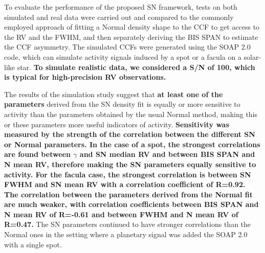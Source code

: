 \documentclass{aa}
\begin{document}
To evaluate the performance of the proposed SN framework, tests on both simulated and real data were carried out and compared to the commonly employed approach of fitting a Normal density shape to the CCF to get access to the RV and the FWHM, and then separately deriving the BIS SPAN to estimate the CCF asymmetry.
The simulated CCFs were generated using the SOAP 2.0 code, which can simulate activity signals induced by a spot or a facula on a solar-like star. {\bf To simulate realistic data, we considered a S/N of 100, which is typical for high-precision RV observations.}

The results of the simulation study suggest that {\bf at least one of the parameters} derived from the SN density fit is equally or more sensitive to activity than the parameters obtained by the usual Normal method, making this or these parameters more useful indicators of activity. {\bf Sensitivity was measured by the strength of the correlation between the different SN or Normal parameters. In the case of a spot, the strongest correlations are found between $\gamma$ and SN median RV and between BIS SPAN and N mean RV, therefore making the SN parameters equally sensitive to activity. For the facula case, the strongest correlation is between SN FWHM and SN mean RV with a correlation coefficient of R=0.92. The correlation between the parameters derived from the Normal fit are much weaker, with correlation coefficients  between BIS SPAN and N mean RV of R=-0.61 and between FWHM and N mean RV of R=0.47.}
The SN parameters continued to have stronger correlations than the Normal ones in the setting where a planetary signal was added the SOAP 2.0 with a single spot.
\end{document}
